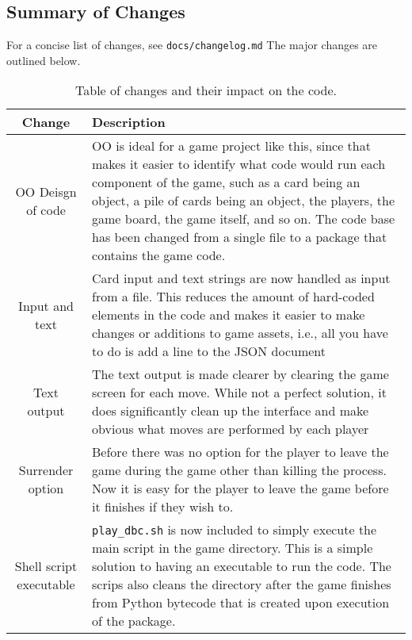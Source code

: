 \documentclass[12pt,a4paper,tightenlines]{article}
\begin{document}
\subsection{Summary of Changes}
For a concise list of changes, see \texttt{docs/changelog.md}
The major changes are outlined below.
\begin{table}[!ht]
    \begin{tabular}{|c|m{10cm}|}
        \hline
        Change & Description\\
        \hline
        OO Deisgn of code & OO is ideal for a game project like this,
        since that makes it easier to identify what code would run 
        each component of the game, such as a card being an object,
        a pile of cards being an object, the players, the game board,
        the game itself, and so on. The code base has been changed from
        a single file to a package that contains the game code.\\
        \hline
        Input and text & Card input and text strings are now handled
        as input from a file. This reduces the amount of hard-coded
        elements in the code and makes it easier to make
        changes or additions to game assets, i.e., all you have to
        do is add a line to the JSON document\\
        \hline 
        Text output & The text output is made clearer by clearing the
        game screen for each move. While not a perfect solution, it
        does significantly clean up the interface and make obvious
        what moves are performed by each player\\
        \hline
        Surrender option & Before there was no option for the player
        to leave the game during the game other than killing the process.
        Now it is easy for the player to leave the game before it 
        finishes if they wish to.\\
        \hline
        Shell script executable & \texttt{play\_dbc.sh} is now 
        included to simply execute the main script in the game
        directory. This is a simple solution to having an executable
        to run the code. The scrips also cleans the directory after
        the game finishes from Python bytecode that is created
        upon execution of the package.\\
        \hline
    \end{tabular}
    \caption{Table of changes and their impact on the code.}
\end{table}
\end{document}
